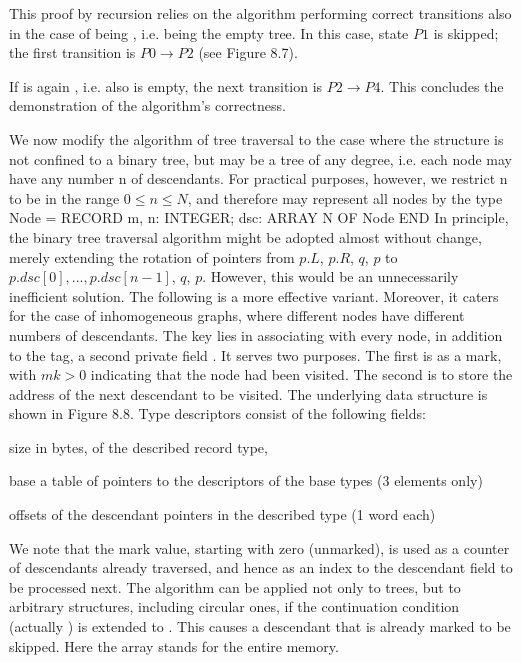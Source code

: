 
This proof by recursion relies on the algorithm performing correct transitions also in the case of  being , i.e.  being the empty tree. In this case, state $P1$ is skipped; the first transition is $P0 \to P2$ (see Figure 8.7).

If  is again , i.e. also  is empty, the next transition is $P2 \to P4$. This concludes the demonstration of the algorithm's correctness.


We now modify the algorithm of tree traversal to the case where the structure is not confined to a binary tree, but may be a tree of any degree, i.e. each node may have any number n of descendants. For practical purposes, however, we restrict n to be in the range $0 \le n \le N$, and therefore may represent all nodes by the type
\begintt
Node = RECORD
  m, n: INTEGER;
  dsc: ARRAY N OF Node
END
\endtt
\noindent In principle, the binary tree traversal algorithm might be adopted almost without change, merely extending the rotation of pointers from $p.L$, $p.R$, $q$, $p$ to $p.dsc[0], ... , p.dsc[n-1]$, $q$, $p$. However, this would be an unnecessarily inefficient solution. The following is a more effective variant. Moreover, it caters for the case of inhomogeneous graphs, where different nodes have different numbers of descendants. The key lies in associating with every node, in addition to the tag, a second private field . It serves two purposes. The first is as a mark, with $mk > 0$ indicating that the node had been visited. The second is to store the address of the next descendant to be visited. The underlying data structure is shown in Figure 8.8. Type descriptors consist of the following fields:

\item{\bullet} size in bytes, of the described record type,
\item{\bullet} base a table of pointers to the descriptors of the base types (3 elements only)
\item{\bullet} offsets of the descendant pointers in the described type (1 word each)

\noindent We note that the mark value, starting with zero (unmarked), is used as a counter of descendants already traversed, and hence as an index to the descendant field to be processed next. The algorithm can be applied not only to trees, but to arbitrary structures, including circular ones, if the continuation condition  (actually ) is extended to . This causes a descendant that is already marked to be skipped. Here the array  stands for the entire memory.

